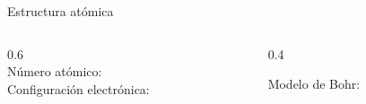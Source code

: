 \documentclass[aspectratio=169]{beamer}
\begin{document}
\begin{frame}{Estructura atómica}
    \begin{columns}[onlytextwidth]
    \begin{column}{0.6\textwidth}
        \alert{}\\[8pt]
        Número atómico: \\[8pt]
        Configuración electrónica:\\[8pt] 
        \\[8pt]  
        \end{column}
    \begin{column}{0.4\textwidth}
    \begin{center}
        Modelo de Bohr:\\[8pt]
    \end{center}
\end{column}
\end{columns}
\end{frame}
\end{document}
